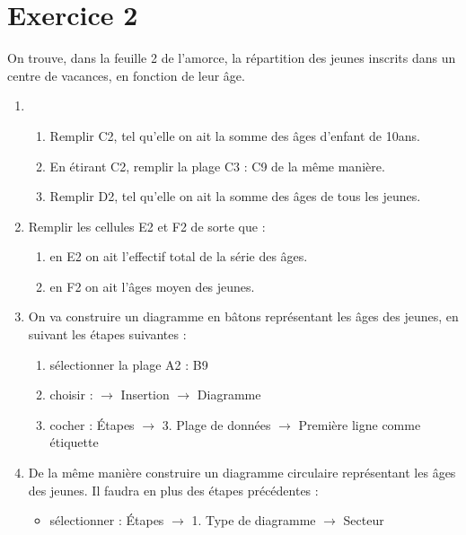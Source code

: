 \section*{Exercice 2}

On trouve,
dans la feuille 2 de l'amorce,
la répartition des jeunes inscrits dans un centre de vacances, en fonction de leur âge.

\begin{enumerate}
    \item \begin{enumerate}
        \item Remplir C2, tel qu'elle on ait la somme des âges d'enfant de 10ans.
        \item En étirant C2, remplir la plage C3 : C9 de la même manière.
        \item Remplir D2, tel qu'elle on ait la somme des âges de tous les jeunes.
    \end{enumerate}
    \item Remplir les cellules E2 et F2 de sorte que :
    \begin{enumerate}
        \item en E2 on ait l'effectif total de la série des âges.
        \item en F2 on ait l'âges moyen des jeunes.
    \end{enumerate}
    \item On va construire un diagramme en bâtons représentant les âges des jeunes,
    en suivant les étapes suivantes :
    \begin{enumerate}
        \item sélectionner la plage A2 : B9
        \item choisir : $\rightarrow$ Insertion $\rightarrow$  Diagramme
        \item cocher : Étapes $\rightarrow$ 3. Plage de données $\rightarrow$ Première ligne comme étiquette
    \end{enumerate}
    \item De la même manière construire un diagramme circulaire représentant les âges des jeunes.
    Il faudra en plus des étapes précédentes :
    \begin{itemize}
        \item sélectionner : Étapes $\rightarrow$ 1. Type de diagramme $\rightarrow$  Secteur
    \end{itemize}    
\end{enumerate}